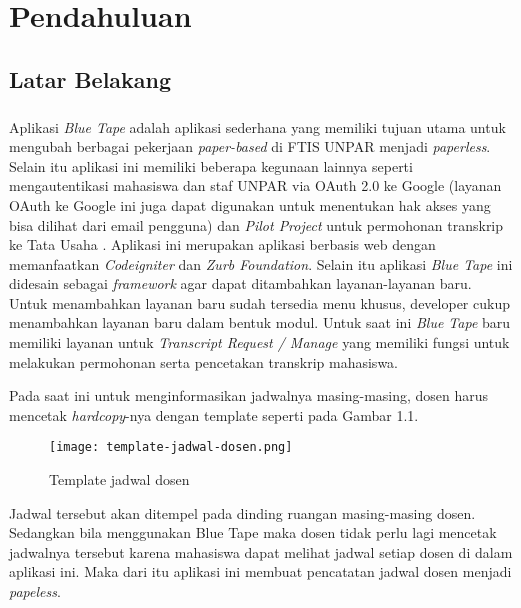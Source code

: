 \chapter{Pendahuluan}
\label{chap:intro}
   
\section{Latar Belakang}
\label{sec:label}

\paragraph{} Aplikasi \textit{Blue Tape} adalah aplikasi sederhana yang memiliki tujuan utama untuk mengubah berbagai pekerjaan \textit{paper-based} di FTIS UNPAR menjadi \textit{paperless}. Selain itu aplikasi ini memiliki beberapa kegunaan lainnya seperti mengautentikasi mahasiswa dan staf UNPAR via OAuth 2.0 ke Google (layanan OAuth ke Google ini juga dapat digunakan untuk menentukan hak akses yang bisa dilihat dari email pengguna) dan \textit{Pilot Project} untuk permohonan transkrip ke Tata Usaha . Aplikasi ini merupakan aplikasi berbasis web dengan memanfaatkan \textit{Codeigniter} dan \textit{Zurb Foundation}. Selain itu aplikasi \textit{Blue Tape} ini didesain sebagai \textit{framework} agar dapat ditambahkan layanan-layanan baru. Untuk menambahkan layanan baru sudah tersedia menu khusus, developer cukup menambahkan layanan baru dalam bentuk modul. Untuk saat ini \textit{Blue Tape} baru memiliki layanan untuk \textit{Transcript Request / Manage} yang memiliki fungsi untuk melakukan permohonan serta pencetakan transkrip mahasiswa.

Pada saat ini untuk menginformasikan jadwalnya masing-masing, dosen harus mencetak \textit{hardcopy}-nya dengan template seperti pada Gambar 1.1.

\begin{figure} [h]
	\centering  
	\texttt{[image: template-jadwal-dosen.png]}  
	\caption[Template jadwal dosen]{Template jadwal dosen} 
	\label{fig:template-jadwal-dosen} 
\end{figure} 
Jadwal tersebut akan ditempel pada dinding ruangan masing-masing dosen. Sedangkan bila menggunakan Blue Tape maka dosen tidak perlu lagi mencetak jadwalnya tersebut karena mahasiswa dapat melihat jadwal setiap dosen di dalam aplikasi ini. Maka dari itu aplikasi ini membuat pencatatan jadwal dosen menjadi \textit{papeless}.

